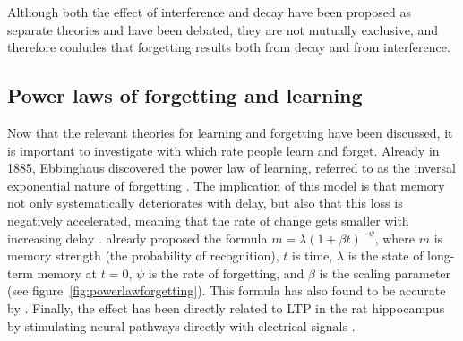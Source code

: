 Although both the effect of interference and decay have been proposed as separate theories and have been debated, they are not mutually exclusive, and  therefore conludes that forgetting results both from decay and from interference.

\subsection{Power laws of forgetting and learning}

Now that the relevant theories for learning and forgetting have been discussed, it is important to investigate with which rate people learn and forget. Already in 1885, Ebbinghaus discovered the power law of learning, referred to as the inversal exponential nature of forgetting \cite{microlearning, activationbasedmodel}. The implication of this model is that memory not only systematically deteriorates with delay, but also that this loss is negatively accelerated, meaning that the rate of change gets smaller with increasing delay \cite{cognitivepsychology}.  already proposed the formula $m = \lambda (1 + \beta t)^{-\psi}$, where $m$ is memory strength (the probability of recognition), $t$ is time, $\lambda$ is the state of long-term memory at $t = 0$, $\psi$ is the rate of forgetting, and $\beta$ is the scaling parameter (see figure~\ref{fig:powerlawforgetting}). This formula has also found to be accurate by . Finally, the effect has been directly related to LTP in the rat hippocampus by stimulating neural pathways directly with electrical signals \cite{raymond}.

